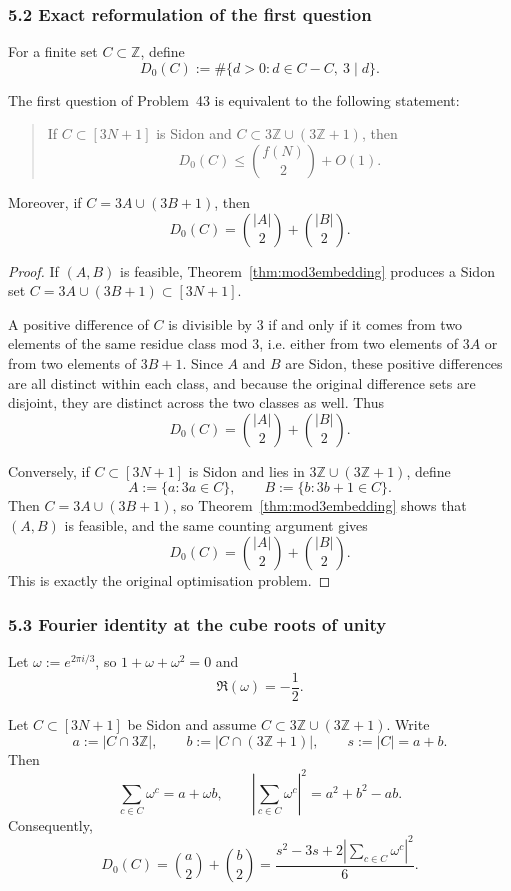 \subsubsection{5.2 Exact reformulation of the first question}

For a finite set $C\subset \mathbb Z$, define
\[
D_0(C):=\#\{d>0:d\in C-C,\ 3\mid d\}.
\]

\begin{corollary}
\label{cor:mod3reform}
The first question of Problem~43 is equivalent to the following statement:
\begin{quote}
If $C\subset [3N+1]$ is Sidon and $C\subset 3\mathbb Z\cup (3\mathbb Z+1)$, then
\[
D_0(C)\le \binom{f(N)}{2}+O(1).
\]
\end{quote}
Moreover, if $C=3A\cup(3B+1)$, then
\[
D_0(C)=\binom{|A|}{2}+\binom{|B|}{2}.
\]
\end{corollary}

\begin{proof}
If $(A,B)$ is feasible, Theorem~\ref{thm:mod3embedding} produces a Sidon set $C=3A\cup(3B+1)\subset [3N+1]$.

A positive difference of $C$ is divisible by $3$ if and only if it comes from two elements of the same residue class mod $3$, i.e. either from two elements of $3A$ or from two elements of $3B+1$.  Since $A$ and $B$ are Sidon, these positive differences are all distinct within each class, and because the original difference sets are disjoint, they are distinct across the two classes as well.  Thus
\[
D_0(C)=\binom{|A|}{2}+\binom{|B|}{2}.
\]

Conversely, if $C\subset [3N+1]$ is Sidon and lies in $3\mathbb Z\cup(3\mathbb Z+1)$, define
\[
A:=\{a:3a\in C\},
\qquad
B:=\{b:3b+1\in C\}.
\]
Then $C=3A\cup(3B+1)$, so Theorem~\ref{thm:mod3embedding} shows that $(A,B)$ is feasible, and the same counting argument gives
\[
D_0(C)=\binom{|A|}{2}+\binom{|B|}{2}.
\]
This is exactly the original optimisation problem.
\end{proof}

\subsubsection{5.3 Fourier identity at the cube roots of unity}

Let $\omega:=e^{2\pi i/3}$, so $1+\omega+\omega^2=0$ and
\[
\Re(\omega)=-\frac12.
\]

\begin{proposition}
\label{prop:fourierformula}
Let $C\subset [3N+1]$ be Sidon and assume $C\subset 3\mathbb Z\cup(3\mathbb Z+1)$.  Write
\[
a:=|C\cap 3\mathbb Z|,
\qquad
b:=|C\cap (3\mathbb Z+1)|,
\qquad
s:=|C|=a+b.
\]
Then
\[
\sum_{c\in C}\omega^c = a+\omega b,
\qquad
\left|\sum_{c\in C}\omega^c\right|^2 = a^2+b^2-ab.
\]
Consequently,
\begin{equation}
\label{eq:fourierD}
D_0(C)=\binom{a}{2}+\binom{b}{2}
=\frac{s^2-3s+2\left|\sum_{c\in C}\omega^c\right|^2}{6}.
\end{equation}
\end{proposition}

